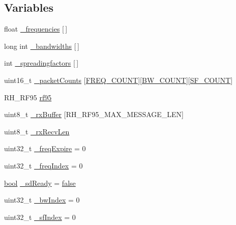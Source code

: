 \subsection*{Variables}
\begin{DoxyCompactItemize}
\item 
float \hyperlink{Uno__Serial__LoRa__Sniffer_8ino_a12522e3ab50a857130288fdb3eb7d57e}{\-\_\-frequencies} \mbox{[}$\,$\mbox{]}
\item 
long int \hyperlink{Uno__Serial__LoRa__Sniffer_8ino_acfd965074b1c957f883e42051264b8af}{\-\_\-bandwidths} \mbox{[}$\,$\mbox{]}
\item 
int \hyperlink{Uno__Serial__LoRa__Sniffer_8ino_a37b226555fa4c17b0735c0d209d6978b}{\-\_\-spreadingfactors} \mbox{[}$\,$\mbox{]}
\item 
uint16\-\_\-t \hyperlink{Uno__Serial__LoRa__Sniffer_8ino_a68c7ae5ce5e529203df1ea6609b5eed1}{\-\_\-packet\-Counts} \mbox{[}\hyperlink{Uno__Serial__LoRa__Sniffer_8ino_ad17aede54a50ee40840cd567946cdd40}{F\-R\-E\-Q\-\_\-\-C\-O\-U\-N\-T}\mbox{]}\mbox{[}\hyperlink{Uno__Serial__LoRa__Sniffer_8ino_a77c97ad595d6a698495d283ebccb9ec6}{B\-W\-\_\-\-C\-O\-U\-N\-T}\mbox{]}\mbox{[}\hyperlink{Uno__Serial__LoRa__Sniffer_8ino_af76f3b8a859dbeb2fbd4a478dd3f4301}{S\-F\-\_\-\-C\-O\-U\-N\-T}\mbox{]}
\item 
R\-H\-\_\-\-R\-F95 \hyperlink{Uno__Serial__LoRa__Sniffer_8ino_ac741fa4056d5cbbcc0ab38fa7d8c6ce3}{rf95}
\item 
uint8\-\_\-t \hyperlink{Uno__Serial__LoRa__Sniffer_8ino_a3e4574cc98a87f4099359ed1324a568c}{\-\_\-rx\-Buffer} \mbox{[}R\-H\-\_\-\-R\-F95\-\_\-\-M\-A\-X\-\_\-\-M\-E\-S\-S\-A\-G\-E\-\_\-\-L\-E\-N\mbox{]}
\item 
uint8\-\_\-t \hyperlink{Uno__Serial__LoRa__Sniffer_8ino_a0e117effc6ddd58d710660c85914a95a}{\-\_\-rx\-Recv\-Len}
\item 
uint32\-\_\-t \hyperlink{Uno__Serial__LoRa__Sniffer_8ino_a24df36067882894b1d20915dabba6da4}{\-\_\-freq\-Expire} = 0
\item 
uint32\-\_\-t \hyperlink{Uno__Serial__LoRa__Sniffer_8ino_aa9301986ea3e70801904faa1215ec9b7}{\-\_\-freq\-Index} = 0
\item 
\hyperlink{stdbool_8h_abb452686968e48b67397da5f97445f5b}{bool} \hyperlink{Uno__Serial__LoRa__Sniffer_8ino_a1d75ade2c180ea5f384c54d08a09c014}{\-\_\-sd\-Ready} = \hyperlink{stdbool_8h_a65e9886d74aaee76545e83dd09011727}{false}
\item 
uint32\-\_\-t \hyperlink{Uno__Serial__LoRa__Sniffer_8ino_ae4f624cc4cbd0cdf62f44620a0228120}{\-\_\-bw\-Index} = 0
\item 
uint32\-\_\-t \hyperlink{Uno__Serial__LoRa__Sniffer_8ino_a16335a7be6509c46683fe6be4a399838}{\-\_\-sf\-Index} = 0
\end{DoxyCompactItemize}


